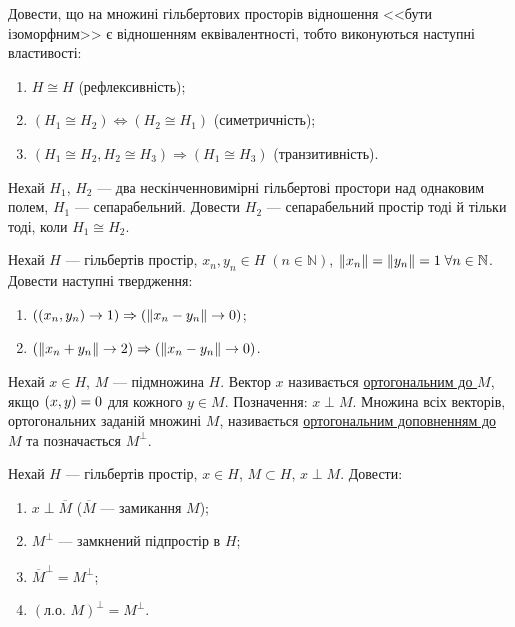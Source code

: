 \begin{exercise}
    Довести, що на множині гільбертових просторів відношення <<бути ізоморфним>>
    є відношенням еквівалентності, тобто виконуються наступні властивості:
    \begin{enumerate}[label=\ukr*)]
        \item $H \cong H$ (рефлексивність);
        \item $(H_1 \cong H_2) \Leftrightarrow (H_2 \cong H_1)$ (симетричність);
        \item $(H_1 \cong H_2, H_2 \cong H_3) \Rightarrow (H_1 \cong H_3)$ (транзитивність).
    \end{enumerate}
\end{exercise}

\begin{exercise}
    Нехай $H_1$, $H_2$ --- два нескінченновимірні гільбертові простори над однаковим полем, $H_1$ --- сепарабельний.
    Довести $H_2$ --- сепарабельний простір тоді й тільки тоді, коли $H_1 \cong H_2$.
\end{exercise}

\begin{exercise}
    Нехай $H$ --- гільбертів простір, $x_n, y_n \in H \; (n \in \mathbb{N})$, $\left\lVert x_n\right\rVert = \left\lVert y_n\right\rVert = 1 \; \forall n \in \mathbb{N}$.
    Довести наступні твердження:
    \begin{enumerate}[label=\ukr*)]
        \item $(\left(x_n, y_n\right) \rightarrow 1) \Rightarrow (\left\lVert x_n - y_n\right\rVert \rightarrow 0)$;
        \item $(\left\lVert x_n + y_n\right\rVert \rightarrow 2) \Rightarrow (\left\lVert x_n - y_n\right\rVert \rightarrow 0)$.
    \end{enumerate}
\end{exercise}

\begin{theory}
    Нехай $x \in H$, $M$ --- підмножина $H$. Вектор $x$ називається \uline{ортогональним до $M$},
    якщо $\left(x, y\right) = 0$ для кожного $y \in M$. Позначення: $x \perp M$.
    Множина всіх векторів, ортогональних заданій множині $M$, називається \uline{ортогональним доповненням до $M$} 
    та позначається $M^\perp$.
\end{theory}

\begin{exercise}
    Нехай $H$ --- гільбертів простір, $x\in H$, $M \subset H$, $x \perp M$.
    Довести:
    \begin{enumerate}[label=\ukr*)]
        \item $x \perp \overline{M}$ ($\overline{M}$ --- замикання $M$);
        \item $M^\perp$ --- замкнений підпростір в $H$;
        \item $\overline{M}^\perp = M^\perp$;
        \item $(\text{л.о. } M)^\perp = M^\perp$.
    \end{enumerate}
\end{exercise}

